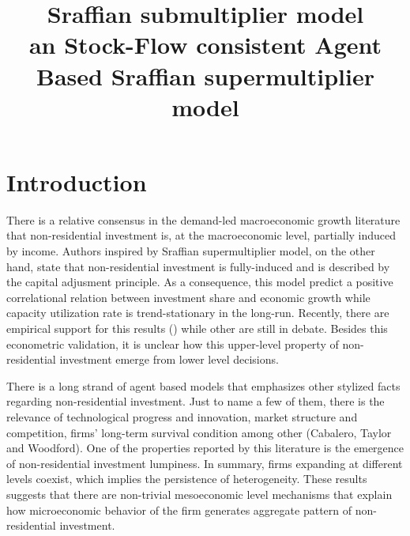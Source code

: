 \documentclass{SelfArx}
\date{}
\title{Sraffian submultiplier model\\\medskip
\large an Stock-Flow consistent Agent Based Sraffian supermultiplier model}
\begin{document}


\newcommand{\keywordname}{Keywords} %


\flushbottom %
\maketitle %
\thispagestyle{empty} %

\section{Introduction}
\label{sec:orge2bdf57}
There is a relative consensus in the demand-led macroeconomic growth literature that non-residential investment is, at the macroeconomic level, partially induced by income.
Authors inspired by Sraffian supermultiplier model, on the other hand, state that non-residential investment is fully-induced and is described by the capital adjusment principle.
As a consequence, this model predict a positive correlational relation between investment share and economic growth while capacity utilization rate is trend-stationary in the long-run.
Recently, there are empirical support for this results () while other are still in debate.
Besides this econometric validation, it is unclear how this upper-level property of non-residential investment emerge from lower level decisions.

There is a long strand of agent based models that emphasizes other stylized facts regarding non-residential investment.
Just to name a few of them, there is the relevance of technological progress and innovation, market structure and competition, firms' long-term survival condition among other (Cabalero, Taylor and Woodford).
One of the properties reported by this literature is the emergence of non-residential investment lumpiness.
In summary, firms expanding at different levels coexist, which implies the persistence of heterogeneity.
These results suggests that there are non-trivial mesoeconomic level mechanisms that explain how microeconomic behavior of the firm generates aggregate pattern of non-residential investment.
\end{document}
